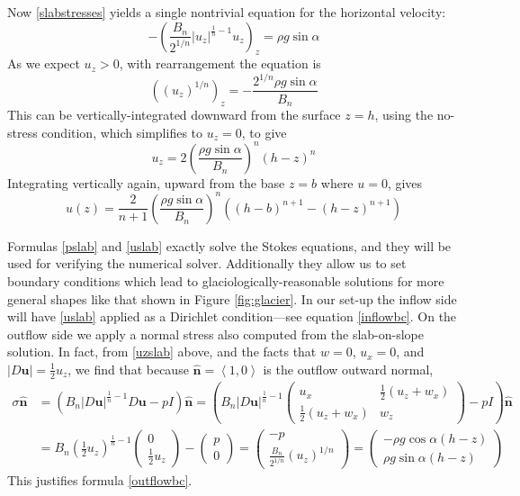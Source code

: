 \documentclass[letterpaper,final,12pt,reqno]{amsart}
\newcommand{\hbn}{\hat{\mathbf{n}}}
\newcommand{\bu}{\mathbf{u}}
\begin{document}
Now \eqref{slabstresses} yields a single nontrivial equation for the horizontal velocity:
    $$- \left(\frac{B_n}{2^{1/n}} |u_z|^{\frac{1}{n}-1} u_z\right)_z = \rho g\sin\alpha$$
As we expect $u_z>0$, with rearrangement the equation is
    $$\left((u_z)^{1/n} \right)_z = - \frac{2^{1/n} \rho g\sin\alpha}{B_n}$$
This can be vertically-integrated downward from the surface $z=h$, using the no-stress condition, which simplifies to $u_z=0$, to give
\begin{equation}
u_z = 2 \left(\frac{\rho g\sin\alpha}{B_n}\right)^n (h-z)^n  \label{uzslab}
\end{equation}
Integrating vertically again, upward from the base $z=b$ where $u=0$, gives
\begin{equation}
u(z) = \frac{2}{n+1} \left(\frac{\rho g\sin\alpha}{B_n}\right)^n \left((h-b)^{n+1} - (h-z)^{n+1}\right)  \label{uslab}
\end{equation}

Formulas \eqref{pslab} and \eqref{uslab} exactly solve the Stokes equations, and they will be used for verifying the numerical solver.  Additionally they allow us to set boundary conditions which lead to glaciologically-reasonable solutions for more general shapes like that shown in Figure \ref{fig:glacier}.  In our set-up the inflow side will have \eqref{uslab} applied as a Dirichlet condition---see equation \eqref{inflowbc}.  On the outflow side we apply a normal stress also computed from the slab-on-slope solution.  In fact, from \eqref{uzslab} above, and the facts that $w=0$, $u_x=0$, and $|D\bu| = \frac{1}{2} u_z$, we find that because $\hbn=\left<1,0\right>$ is the outflow outward normal,
\begin{align*}
\sigma \hbn &= \left(B_n |D\bu|^{\frac{1}{n}-1} D\bu - pI\right)\hbn = \left(B_n |D\bu|^{\frac{1}{n}-1} \begin{pmatrix} u_x & \frac{1}{2}(u_z+w_x) \\ \frac{1}{2}(u_z+w_x) & w_z \end{pmatrix} - pI\right)\hbn \\
    &= B_n \left(\frac{1}{2} u_z\right)^{\frac{1}{n}-1} \begin{pmatrix} 0 \\ \frac{1}{2} u_z \end{pmatrix} - \begin{pmatrix} p \\ 0 \end{pmatrix} = \begin{pmatrix} - p \\ \frac{B_n}{2^{1/n}} (u_z)^{1/n} \end{pmatrix} = \begin{pmatrix} - \rho g\cos\alpha (h-z) \\ \rho g\sin\alpha (h-z) \end{pmatrix}
\end{align*}
This justifies formula \eqref{outflowbc}.
\end{document}
